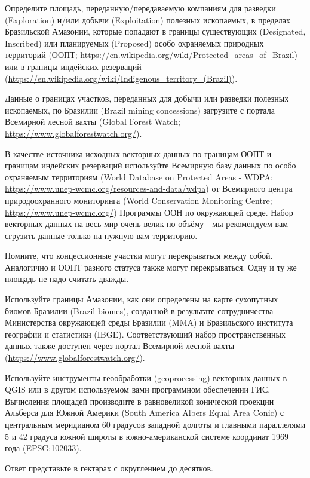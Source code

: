 
Определите площадь, переданную/передаваемую компаниям для разведки \linebreak (Exploration) 
и/или добычи (Exploitation) полезных ископаемых, в пределах Бразильской Амазонии, 
которые попадают в границы существующих (Designated, Inscribed) или планируемых (Proposed) 
особо охраняемых природных территорий (ООПТ; \url{https://en.wikipedia.org/wiki/Protected_areas_of_Brazil}) или 
в границы индейских резерваций (\url{https://en.wikipedia.org/wiki/Indigenous_territory_(Brazil)}).

Данные о границах участков, переданных для добычи или разведки полезных ископаемых, по Бразилии 
(Brazil mining concessions) загрузите с портала Всемирной лесной вахты (Global Forest Watch; \url{https://www.globalforestwatch.org/}).

В качестве источника исходных векторных данных по границам ООПТ и границам индейских резерваций используйте 
Всемирную базу данных по особо охраняемым территориям (World Database on Protected Areas - WDPA; \url{https://www.unep-wcmc.org/resources-and-data/wdpa}) 
от Всемирного центра природоохранного мониторинга (World Conservation Monitoring Centre; \url{https://www.unep-wcmc.org/}) Программы ООН по окружающей среде. Набор векторных данных на весь мир очень велик по объёму - мы рекомендуем вам сгрузить данные только на нужную вам территорию.

Помните, что концессионные участки могут перекрываться между собой. Аналогично и ООПТ разного статуса также могут перекрываться. Одну и ту же площадь не надо считать дважды.

Используйте границы Амазонии, как они определены на карте сухопутных биомов Бразилии (Brazil biomes), 
созданной в результате сотрудничества Министерства окружающей среды Бразилии (MMA) и Бразильского института 
географии и статистики (IBGE). Соответствующий набор пространственных данных также доступен через портал 
Всемирной лесной вахты (\url{https://www.globalforestwatch.org/}).

Используйте инструменты геообработки (geoprocessing) векторных данных в QGIS или в другом используемом вами программном обеспечении ГИС. Вычисления площадей производите в равновеликой конической проекции Альберса для Южной Америки (South America Albers Equal Area Conic) с центральным меридианом 60 градусов западной долготы и главными параллелями 5 и 42 градуса южной широты в южно-американской системе координат 1969 года (EPSG:102033).

Ответ представьте в гектарах с округлением до десятков.